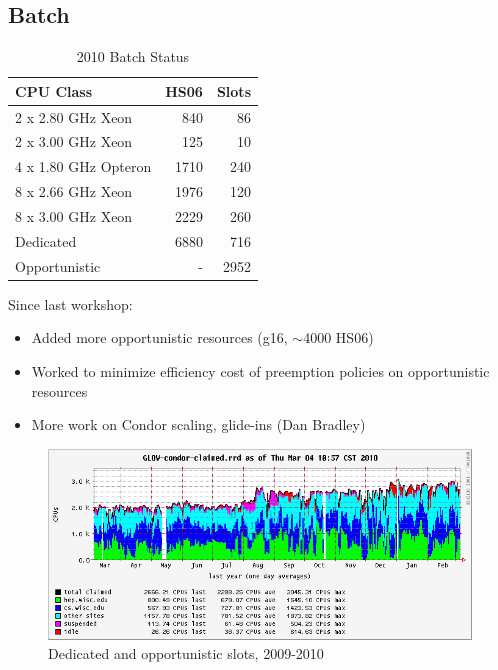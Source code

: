 \documentclass{beamer}
\newcommand{\ca}{\ensuremath{\sim}}
\begin{document}
\subsection{Batch}
\begin{frame}
\begin{table}
\begin{tabular}{lrr}
	\toprule
	CPU Class							&	 HS06		&	Slots \\
	\midrule
	2 x 2.80 GHz Xeon			&	 840		&	 86 \\	%
	2 x 3.00 GHz Xeon			&	 125		&	 10 \\	%
	4 x 1.80 GHz Opteron	&	 1710	 	&	 240 \\	%
	8 x 2.66 GHz Xeon			&	 1976	 	&	 120 \\	%
	8 x 3.00 GHz Xeon			&	 2229		&	 260 \\	%
	\midrule
	Dedicated							&	 6880		&	 716 \\
	Opportunistic					&	 -			&	 2952 \\
	\bottomrule
\end{tabular}
\caption{2010 Batch Status}
\label{2010_batch_status}
\end{table}

Since last workshop:
\begin{itemize}
	\item Added more opportunistic resources (g16, \ca{}4000 HS06)
	\item Worked to minimize efficiency cost of preemption policies on opportunistic resources
	\item More work on Condor scaling, glide-ins (Dan Bradley)
\end{itemize}
\end{frame}

\begin{frame}
\begin{figure}
	\includegraphics[width=\textwidth]{Graphics/GLOW-condor-claimed-1yr.png}
	\caption{Dedicated and opportunistic slots, 2009-2010}
\end{figure}
\end{frame}
\end{document}
